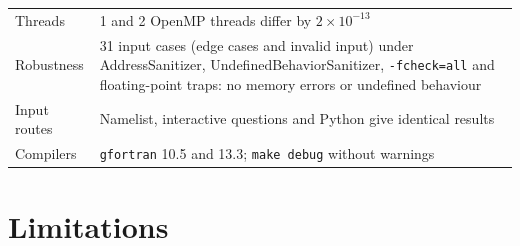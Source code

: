 \documentclass[11pt,a4paper]{article}
\newcommand{\code}[1]{\texttt{#1}}
\begin{document}
\begin{table}[h]
\begin{tabularx}{\textwidth}{@{}p{4.6cm}X@{}}
Threads & 1 and 2 OpenMP threads differ by $2\times10^{-13}$ \\
Robustness & 31 input cases (edge cases and invalid input) under AddressSanitizer,
  UndefinedBehaviorSanitizer, \code{-fcheck=all} and floating-point traps: no memory errors or
  undefined behaviour \\
Input routes & Namelist, interactive questions and Python give identical results \\
Compilers & \code{gfortran} 10.5 and 13.3; \code{make debug} without warnings \\
\bottomrule
\end{tabularx}
\end{table}

\FloatBarrier
\section{Limitations}
\label{sec:limits}
\end{document}
